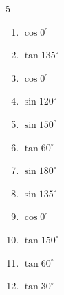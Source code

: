 \begin{multicols}{5}
\begin{enumerate}

  \item $\displaystyle \cos{0^\circ}$

        \phantom{$\displaystyle =1$}

  \item $\displaystyle \tan{135^\circ}$

        \phantom{$\displaystyle =-1$}

  \item $\displaystyle \cos{0^\circ}$

        \phantom{$\displaystyle =1$}

  \item $\displaystyle \sin{120^\circ}$


  \item $\displaystyle \sin{150^\circ}$


  \item $\displaystyle \tan{60^\circ}$


  \item $\displaystyle \sin{180^\circ}$

        \phantom{$\displaystyle =0$}

  \item $\displaystyle \sin{135^\circ}$


  \item $\displaystyle \cos{0^\circ}$

        \phantom{$\displaystyle =1$}

  \item $\displaystyle \tan{150^\circ}$


  \item $\displaystyle \tan{60^\circ}$


  \item $\displaystyle \tan{30^\circ}$


\columnbreak %


\end{enumerate}
\end{multicols}
